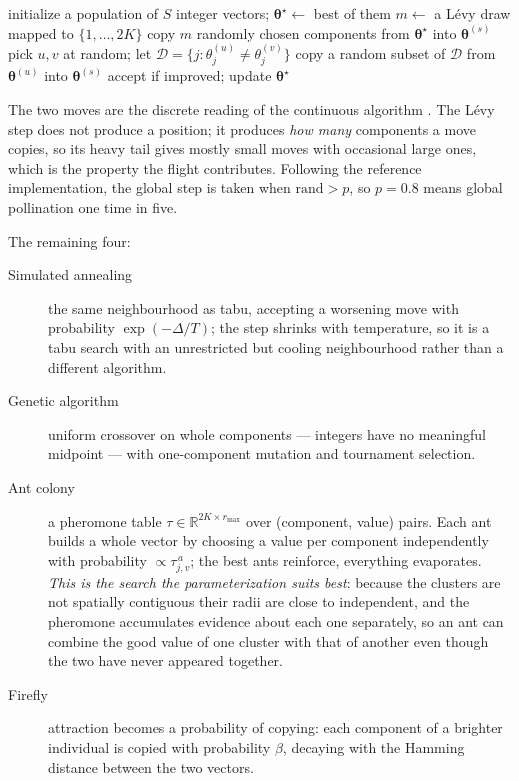 \documentclass[11pt,a4paper]{article}
\theoremstyle{definition}
\begin{document}
\begin{algorithm}[t]
\caption{Discrete flower pollination}
\begin{algorithmic}[1]
\State initialize a population of $S$ integer vectors; $\boldsymbol{\theta}^\star
       \gets$ best of them
     
      \State $m \gets$ a L\'evy draw mapped to $\{1,\dots,2K\}$
      \State copy $m$ randomly chosen components from
             $\boldsymbol{\theta}^\star$ into $\boldsymbol{\theta}^{(s)}$
    \Else {}
      \State pick $u, v$ at random; let $\mathcal{D} =
             \{j : \theta^{(u)}_j \neq \theta^{(v)}_j\}$
      \State copy a random subset of $\mathcal{D}$ from
             $\boldsymbol{\theta}^{(u)}$ into $\boldsymbol{\theta}^{(s)}$
    \EndIf
    \State accept if improved; update $\boldsymbol{\theta}^\star$
  \EndFor
\EndWhile
\end{algorithmic}
\end{algorithm}

\noindent
The two moves are the discrete reading of the continuous algorithm
\cite{yang2012}. The L\'evy step does not produce a position; it produces
\emph{how many} components a move copies, so its heavy tail gives mostly small
moves with occasional large ones, which is the property the flight contributes.
Following the reference implementation, the global step is taken when
$\mathrm{rand} > p$, so $p = 0.8$ means global pollination one time in five.

\medskip
\noindent
The remaining four:

\begin{description}
  \item[Simulated annealing] the same neighbourhood as tabu, accepting a
    worsening move with probability $\exp(-\Delta/T)$; the step shrinks with
    temperature, so it is a tabu search with an unrestricted but cooling
    neighbourhood rather than a different algorithm.
  \item[Genetic algorithm] uniform crossover on whole components --- integers
    have no meaningful midpoint --- with one-component mutation and tournament
    selection.
  \item[Ant colony] a pheromone table $\tau \in \mathbb{R}^{2K \times r_{\max}}$
    over (component, value) pairs. Each ant builds a whole vector by choosing a
    value per component independently with probability
    $\propto \tau_{j,v}^{\,a}$; the best ants reinforce, everything evaporates.
    \emph{This is the search the parameterization suits best}: because the
    clusters are not spatially contiguous their radii are close to independent,
    and the pheromone accumulates evidence about each one separately, so an ant
    can combine the good value of one cluster with that of another even though
    the two have never appeared together.
  \item[Firefly] attraction becomes a probability of copying: each component of
    a brighter individual is copied with probability $\beta$, decaying with the
    Hamming distance between the two vectors.
\end{description}
\end{document}
